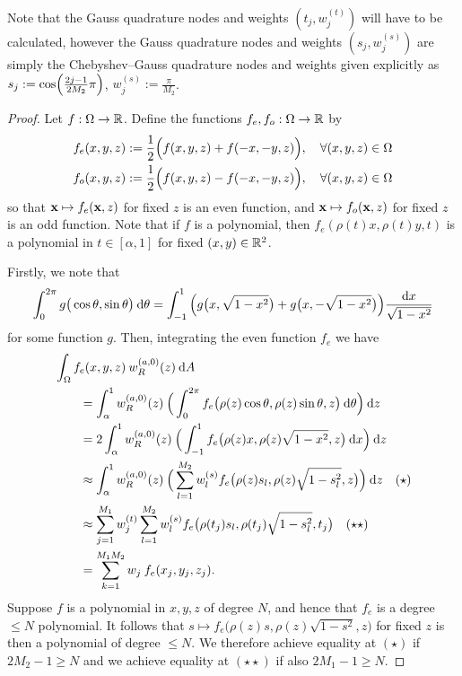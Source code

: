 \documentclass[11pt, oneside]{article}   	%
\begin{document}
\begin{remark} 
	Note that the Gauss quadrature nodes and weights $(t_j, w_j^{(t)})$ will have to be calculated, however the Gauss quadrature nodes and weights $(s_j, w_j^{(s)})$ are simply the Chebyshev--Gauss quadrature nodes and weights given explicitly \cite[3.5.23]{DLMF} as $s_j := \cos \fpr(\frac{2j - 1}{2M_2} \pi)$, $w_j^{(s)} := \frac{\pi}{M_2}$.
\end{remark}

\begin{proof}
Let $f : \Omega \to \mathbb{R}$. Define the functions $f_e, f_o : \Omega \to \mathbb{R}$ by 
\begin{align*}
	f_e(x,y,z) &:= \frac{1}{2} \Big(f(x, y,z) + f(-x, -y,z)\Big), \quad \forall (x,y,z) \in \Omega\\
	f_o(x,y,z) &:= \frac{1}{2} \Big(f(x, y,z) - f(-x, -y,z)\Big), \quad \forall (x,y,z) \in \Omega
\end{align*}
so that $\mathbf{x} \mapsto f_e(\mathbf{x}, z)$ for fixed $z$ is an even function, and $\mathbf{x} \mapsto f_o(\mathbf{x}, z)$ for fixed $z$ is an odd function. Note that if $f$ is a polynomial, then $f_e(\rho(t)x, \rho(t)y, t)$ is a polynomial in $t \in [\alpha,1]$ for fixed $(x,y) \in \mathbb{R}^2$. 

Firstly, we note that
\begin{align*}
	\int_0^{2\pi} g\big(\cos \theta, \sin\theta\big) \: {\rm d} \theta = \int_{-1}^1 \Big( g\big(x, \sqrt{1-x^2}\big) + g\big(x, -\sqrt{1-x^2}\big) \Big) \frac{{\rm d} x}{\sqrt{1-x^2}}
\end{align*}
for some function $g$. Then, integrating the even function $f_e$ we have
\begin{align*}
	&\int_\Omega f_e(x,y,z) \: w_R^{(a,0)}(z) \: {\rm d} A \\
	&\quad \quad = \int_\alpha^1 w_R^{(a,0)}(z) \: \Big( \int_0^{2\pi} f_e\big(\rho(z)\cos\theta,\rho(z)\sin\theta, z\big) \: {\rm d} \theta \Big) \: {\rm d} z \\
	&\quad \quad = 2 \int_\alpha^1 w_R^{(a,0)}(z) \: \Big( \int_{-1}^1 f_e\big(\rho(z)x,\rho(z)\sqrt{1-x^2}, z\big) \: {\rm d} x \Big) \: {\rm d} z \\
	&\quad \quad \approx \int_\alpha^1 w_R^{(a,0)}(z) \: \Big( \sum_{l=1}^{M_2} w_l^{(s)} f_e\big(\rho(z) s_l, \rho(z) \sqrt{1 - s_l^2}, z\big) \Big) \: {\rm d} z \quad (\star) \\
	&\quad \quad \approx \sum_{j=1}^{M_1} w_j^{(t)} \sum_{l=1}^{M_2} w_l^{(s)} f_e\big(\rho(t_j) s_l, \rho(t_j) \sqrt{1 - s_l^2}, t_j\big) \quad (\star \star) \\
	&\quad \quad = \sum_{k=1}^{M_1 M_2}  w_j \: f_e(x_j, y_j, z_j).
\end{align*}
Suppose $f$ is a polynomial in $x,y,z$ of degree $N$, and hence that $f_e$ is a degree $\le N$ polynomial. It follows that $s \mapsto f_e\big(\rho(z)s,\rho(z)\sqrt{1-s^2}, z\big)$ for fixed $z$ is then a polynomial of degree $\le N$. We therefore achieve equality at $(\star)$ if $2M_2 - 1 \ge N$ and we achieve equality at $(\star \star)$ if also $2M_1 - 1 \ge N$.


\end{proof}
\end{document}

